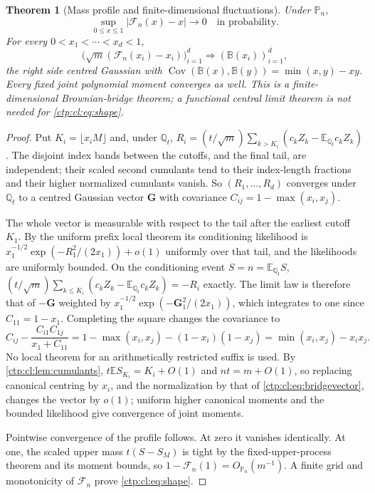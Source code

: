 \documentclass[11pt,a4paper]{article}
\numberwithin{equation}{section}
\newtheorem{theorem}{Theorem}[section]
\theoremstyle{definition}
\theoremstyle{remark}
\newcommand{\PP}{\mathbb P}
\newcommand{\E}{\mathbb E}
\newcommand{\Q}{\mathbb Q}
\DeclareMathOperator{\Cov}{Cov}
\begin{document}
\begin{theorem}[Mass profile and finite-dimensional fluctuations]\label{ctp:cl:thm:bridge}
Under $\PP_n$,
\begin{equation}\label{ctp:cl:eq:shape}
 \sup_{0\le x\le1}|\mathcal F_n(x)-x|\to0\quad\text{in probability}.
\end{equation}
For every $0<x_1<\cdots<x_d<1$,
\begin{equation}\label{ctp:cl:eq:bridgevector}
 \bigl(\sqrt m(\mathcal F_n(x_i)-x_i)\bigr)_{i=1}^d\Rightarrow(\mathbb B(x_i))_{i=1}^d,
\end{equation}
the right side centred Gaussian with $\Cov(\mathbb B(x),\mathbb B(y))=\min(x,y)-xy$.
Every fixed joint polynomial moment converges as well. This is a
finite-dimensional Brownian-bridge theorem; a functional central limit
theorem is not needed for \eqref{ctp:cl:eq:shape}.
\end{theorem}
\begin{proof}
Put $K_i=\lfloor x_iM\rfloor$ and, under $\Q_t$,
$R_i=(t/\sqrt m)\sum_{k>K_i}(c_kZ_k-\E_{\Q_t}c_kZ_k)$. The disjoint index
bands between the cutoffs, and the final tail, are independent; their scaled
second cumulants tend to their index-length fractions and their higher
normalized cumulants vanish. So $(R_1,\ldots,R_d)$ converges under $\Q_t$ to
a centred Gaussian vector $\mathbf G$ with covariance
$C_{ij}=1-\max(x_i,x_j)$.

The whole vector is measurable with respect to the tail after the earliest
cutoff $K_1$. By the uniform prefix local theorem its conditioning
likelihood is $x_1^{-1/2}\exp(-R_1^2/(2x_1))+o(1)$ uniformly over that tail,
and the likelihoods are uniformly bounded. On the conditioning event
$S=n=\E_{\Q_t}S$, $(t/\sqrt m)\sum_{k\le K_i}(c_kZ_k-\E_{\Q_t}c_kZ_k)=-R_i$
exactly. The limit law is therefore that of $-\mathbf G$ weighted by
$x_1^{-1/2}\exp(-\mathbf G_1^2/(2x_1))$, which integrates to one since
$C_{11}=1-x_1$. Completing the square changes the covariance to
\[
 C_{ij}-\frac{C_{i1}C_{1j}}{x_1+C_{11}}=1-\max(x_i,x_j)-(1-x_i)(1-x_j)=\min(x_i,x_j)-x_ix_j.
\]
No local theorem for an arithmetically restricted suffix is used. By
\cref{ctp:cl:lem:cumulants}, $t\E S_{K_i}=K_i+O(1)$ and $nt=m+O(1)$, so
replacing canonical centring by $x_i$, and the normalization by that of
\eqref{ctp:cl:eq:bridgevector}, changes the vector by $o(1)$; uniform higher
canonical moments and the bounded likelihood give convergence of joint
moments.

Pointwise convergence of the profile follows. At zero it vanishes
identically. At one, the scaled upper mass $t(S-S_M)$ is tight by the
fixed-upper-process theorem and its moment bounds, so
$1-\mathcal F_n(1)=O_{\PP_n}(m^{-1})$. A finite grid and monotonicity of
$\mathcal F_n$ prove \eqref{ctp:cl:eq:shape}.
\end{proof}
\end{document}
